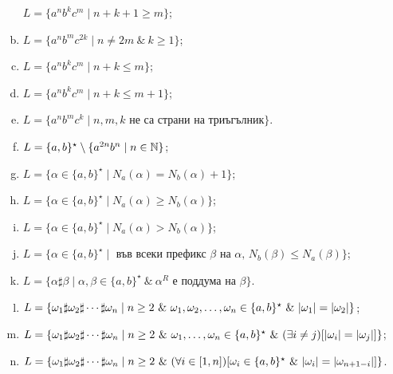 \begin{problem}
\begin{enumerate}[a)]
    $L = \{a^nb^kc^m \mid n + k + 1 \geq m\}$;
  \item
    $L = \{a^nb^mc^{2k} \mid n \neq 2m\ \&\ k \geq 1\}$;
  \item
    $L = \{a^nb^kc^m \mid n + k \leq m\}$;
  \item
    $L = \{a^nb^kc^m \mid n + k \leq m+1\}$;
  \item
    $L = \{a^nb^mc^k \mid n, m, k \text{ не са страни на триъгълник}\}$.
  \item
    $L = \{a,b\}^\star \setminus \{a^{2n}b^n \mid n\in\mathbb{N}\}$;
  \item
    $L = \{\alpha \in \{a,b\}^\star\mid N_a(\alpha) = N_b(\alpha) + 1\}$;
  \item
    $L = \{\alpha \in \{a,b\}^\star\mid N_a(\alpha) \geq N_b(\alpha)\}$;
  \item
    $L = \{\alpha \in \{a,b\}^\star\mid N_a(\alpha) > N_b(\alpha)\}$;
  \item
    $L = \{\alpha \in \{a,b\}^\star \mid \text{ във всеки префикс $\beta$ на $\alpha$, } N_b(\beta) \leq N_a(\beta)\}$;
  \item
    $L = \{\alpha \sharp \beta \mid \alpha,\beta \in \{a,b\}^\star\ \&\ \alpha^R\mbox{ е поддума на }\beta \}$.
  \item
    $L = \{\omega_1 \sharp \omega_2 \sharp \cdots \sharp \omega_n \mid n\geq 2\ \&\ \omega_1,\omega_2,\dots,\omega_n \in \{a,b\}^\star\ \&\ \abs{\omega_1} = \abs{\omega_2}\}$;
  \item
    $L = \{\omega_1 \sharp \omega_2 \sharp \cdots \sharp \omega_n \mid n\geq 2\ \&\ \omega_1,\dots,\omega_n \in \{a,b\}^\star\ \&\ (\exists i \neq j)[\vert{\omega_i}\vert = \vert{\omega_j}\vert]\}$;
  \item
    $L = \{\omega_1 \sharp \omega_2 \sharp \cdots \sharp \omega_n \mid n\geq 2\ \&\ (\forall i\in[1,n])[\omega_i \in \{a,b\}^\star\ \&\ \vert{\omega_i}\vert = \vert{\omega_{n+1-i}}\vert]\}$.
  \end{enumerate}
\end{problem}
